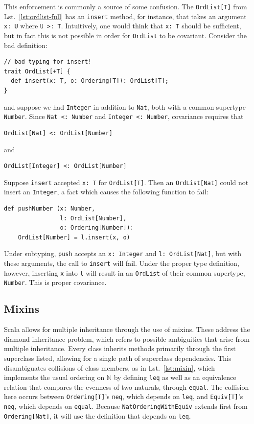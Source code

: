 \documentclass[jou,apacite]{IEEEtran}
\begin{document}
This enforcement is commonly a source of some confusion. The \texttt{OrdList[T]}
from Lst.~\ref{lst:ordlist-full} has an \texttt{insert} method, for instance,
that takes an argument \texttt{x: U} where \texttt{U >: T}. Intuitively, one
would think that \texttt{x: T} should be sufficient, but in fact this is not
possible in order for \texttt{OrdList} to be covariant. Consider the bad
definition:
\begin{verbatim}
// bad typing for insert! 
trait OrdList[+T] {
  def insert(x: T, o: Ordering[T]): OrdList[T];
}
\end{verbatim}
and suppose we had \texttt{Integer} in addition to \texttt{Nat}, both with a
common supertype \texttt{Number}. Since \texttt{Nat <: Number} and
\texttt{Integer <: Number}, covariance requires that
\begin{verbatim}
OrdList[Nat] <: OrdList[Number]
\end{verbatim}
and
\begin{verbatim}
OrdList[Integer] <: OrdList[Number]
\end{verbatim}
Suppose \texttt{insert} accepted \texttt{x: T} for \texttt{OrdList[T]}. Then an
\texttt{OrdList[Nat]} could not insert an \texttt{Integer}, a fact which causes
the following function to fail:
\begin{verbatim}
def pushNumber (x: Number, 
                l: OrdList[Number], 
                o: Ordering[Number]): 
    OrdList[Number] = l.insert(x, o)
\end{verbatim}
Under subtyping, \texttt{push} accepts an \texttt{x: Integer} and \texttt{l:
  OrdList[Nat]}, but with these arguments, the call to \texttt{insert} will
fail. Under the proper type definition, however, inserting \texttt{x} into
\texttt{l} will result in an \texttt{OrdList} of their common supertype,
\texttt{Number}. This is proper covariance.

\subsection{Mixins}
\label{sec:mixins}

Scala allows for multiple inheritance through the use of mixins. These address
the diamond inheritance problem, which refers to possible ambiguities that arise
from multiple inheritance. Every class inherits methods primarily through the
first superclass listed, allowing for a single path of superclass
dependencies. This disambiguates collisions of class members, as in
Lst.~\ref{lst:mixin}, which implements the usual ordering on $\mathbb{N}$ by
defining \texttt{leq} as well as an equivalence relation that compares the
evenness of two naturals, through \texttt{equal}. The collision here occurs
between \texttt{Ordering[T]}'s \texttt{neq}, which depends on \texttt{leq}, and
\texttt{Equiv[T]}'s \texttt{neq}, which depends on \texttt{equal}. Because
\texttt{NatOrderingWithEquiv} extends first from \texttt{Ordering[Nat]}, it will
use the definition that depends on \texttt{leq}.
\end{document}

